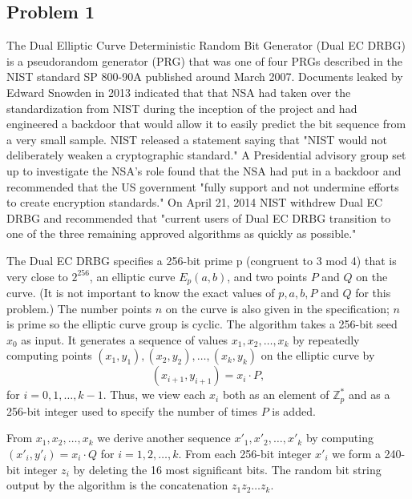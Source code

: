 \documentclass[../hw_sols.tex]{subfiles}
\begin{document}
\subsection*{Problem 1}

The Dual Elliptic Curve Deterministic Random Bit Generator (Dual EC DRBG) is 
a pseudorandom generator (PRG) that was one of four PRGs described in the 
NIST standard SP 800-90A published around March 2007. Documents leaked by 
Edward Snowden in 2013 indicated that that NSA had taken over the 
standardization from NIST during the inception of the project and had 
engineered a backdoor that would allow it to easily predict the bit sequence 
from a very small sample. NIST released a statement saying that "NIST would 
not deliberately weaken a cryptographic standard." A Presidential advisory 
group set up to investigate the NSA's role found that the NSA had put in a 
backdoor and recommended that the US government "fully support and not 
undermine efforts to create encryption standards." On April 21, 2014 NIST 
withdrew Dual EC DRBG and recommended that "current users of Dual EC DRBG 
transition to one of the three remaining approved algorithms as quickly as 
possible."

The Dual EC DRBG specifies a 256-bit prime p (congruent to 3 mod 4) that is 
very close to $2^{256}$, an elliptic curve $E_p(a, b)$, and two points $P$ 
and $Q$ on the curve. (It is not important to know the exact values of 
$p, a, b, P$ and $Q$ for this problem.) The number points $n$ on the curve is 
also given in the specification; $n$ is prime so the elliptic curve group is 
cyclic. The algorithm takes a 256-bit seed $x_0$ as input. It generates a 
sequence of values $x_1, x_2, \dots, x_k$ by repeatedly computing points 
$(x_1, y_1), (x_2, y_2), \dots, (x_k, y_k)$ on the elliptic curve by
	$$(x_{i+1}, y_{i+1}) = x_i \cdot P,$$
for $i = 0, 1, \dots,k-1$. Thus, we view each $x_i$ both as an element of 
$\mathbb{Z}^*_p$ and as a 256-bit integer used to specify the number of times 
$P$ is added.

From $x_1, x_2, \dots, x_k$ we derive another sequence 
$x'_1, x'_2, \dots, x'_k$ by computing $(x'_i, y'_i) = x_i \cdot Q$ for 
$i = 1, 2, \dots, k$. From each 256-bit integer $x'_i$ we form a 240-bit 
integer $z_i$ by deleting the 16 most significant bits. The random bit string 
output by the algorithm is the concatenation $z_1 z_2 \dots z_k$.
\end{document}
